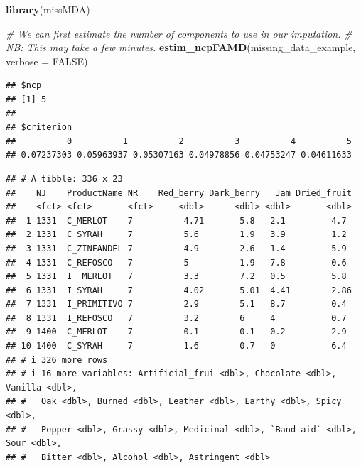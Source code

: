 \documentclass[
]{book}
\newenvironment{Shaded}{\begin{snugshade}}{\end{snugshade}}
\newcommand{\AttributeTok}[1]{\textcolor[rgb]{0.13,0.29,0.53}{#1}}
\newcommand{\CommentTok}[1]{\textcolor[rgb]{0.56,0.35,0.01}{\textit{#1}}}
\newcommand{\ConstantTok}[1]{\textcolor[rgb]{0.56,0.35,0.01}{#1}}
\newcommand{\DecValTok}[1]{\textcolor[rgb]{0.00,0.00,0.81}{#1}}
\newcommand{\FunctionTok}[1]{\textcolor[rgb]{0.13,0.29,0.53}{\textbf{#1}}}
\newcommand{\NormalTok}[1]{#1}
\newcommand{\OtherTok}[1]{\textcolor[rgb]{0.56,0.35,0.01}{#1}}
\newcommand{\SpecialCharTok}[1]{\textcolor[rgb]{0.81,0.36,0.00}{\textbf{#1}}}
\begin{document}
\begin{Shaded}
\begin{Highlighting}[]
\FunctionTok{library}\NormalTok{(missMDA)}

\CommentTok{\# We can first estimate the number of components to use in our imputation.}
\CommentTok{\# NB: This may take a few minutes.}
\FunctionTok{estim\_ncpFAMD}\NormalTok{(missing\_data\_example, }\AttributeTok{verbose =} \ConstantTok{FALSE}\NormalTok{)}
\end{Highlighting}
\end{Shaded}

\begin{verbatim}
## $ncp
## [1] 5
## 
## $criterion
##          0          1          2          3          4          5 
## 0.07237303 0.05963937 0.05307163 0.04978856 0.04753247 0.04611633
\end{verbatim}

\begin{Shaded}
\end{Shaded}

\begin{verbatim}
## # A tibble: 336 x 23
##    NJ    ProductName NR    Red_berry Dark_berry   Jam Dried_fruit
##    <fct> <fct>       <fct>     <dbl>      <dbl> <dbl>       <dbl>
##  1 1331  C_MERLOT    7          4.71       5.8   2.1         4.7 
##  2 1331  C_SYRAH     7          5.6        1.9   3.9         1.2 
##  3 1331  C_ZINFANDEL 7          4.9        2.6   1.4         5.9 
##  4 1331  C_REFOSCO   7          5          1.9   7.8         0.6 
##  5 1331  I__MERLOT   7          3.3        7.2   0.5         5.8 
##  6 1331  I_SYRAH     7          4.02       5.01  4.41        2.86
##  7 1331  I_PRIMITIVO 7          2.9        5.1   8.7         0.4 
##  8 1331  I_REFOSCO   7          3.2        6     4           0.7 
##  9 1400  C_MERLOT    7          0.1        0.1   0.2         2.9 
## 10 1400  C_SYRAH     7          1.6        0.7   0           6.4 
## # i 326 more rows
## # i 16 more variables: Artificial_frui <dbl>, Chocolate <dbl>, Vanilla <dbl>,
## #   Oak <dbl>, Burned <dbl>, Leather <dbl>, Earthy <dbl>, Spicy <dbl>,
## #   Pepper <dbl>, Grassy <dbl>, Medicinal <dbl>, `Band-aid` <dbl>, Sour <dbl>,
## #   Bitter <dbl>, Alcohol <dbl>, Astringent <dbl>
\end{verbatim}
\end{document}
